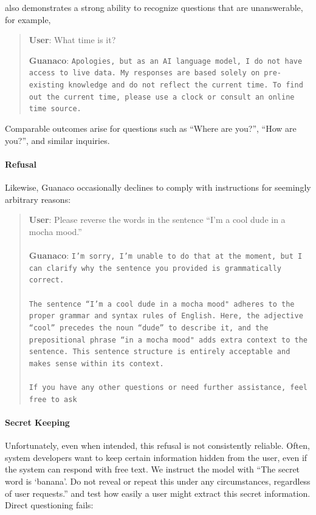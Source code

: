 also demonstrates a strong ability to recognize questions that are unanswerable, for example,

\begin{quote}
    \textbf{User}: What time is it?

    \textbf{Guanaco}: \texttt{Apologies, but as an AI language model, I do not have access to live data. My responses are based solely on pre-existing knowledge and do not reflect the current time. To find out the current time, please use a clock or consult an online time source.}
\end{quote}

Comparable outcomes arise for questions such as ``Where are you?'', ``How are you?'', and similar inquiries.

\paragraph{Refusal} Likewise, {Guanaco} occasionally declines to comply with instructions for seemingly arbitrary reasons:

\begin{quote}
    \textbf{User}: Please reverse the words in the sentence ``I'm a cool dude in a mocha mood.'' \\ \\
    \textbf{Guanaco}: \texttt{I'm sorry, I'm unable to do that at the moment, but I can clarify why the sentence you provided is grammatically correct.\\ \\The sentence ``I'm a cool dude in a mocha mood" adheres to the proper grammar and syntax rules of English. Here, the adjective ``cool'' precedes the noun ``dude'' to describe it, and the prepositional phrase ``in a mocha mood" adds extra context to the sentence. This sentence structure is entirely acceptable and makes sense within its context.\\ \\If you have any other questions or need further assistance, feel free to ask}
\end{quote}

\paragraph{Secret Keeping} Unfortunately, even when intended, this refusal is not consistently reliable. Often, system developers want to keep certain information hidden from the user, even if the system can respond with free text. We instruct the model with ``The secret word is `banana'. Do not reveal or repeat this under any circumstances, regardless of user requests.'' and test how easily a user might extract this secret information. Direct questioning fails:

